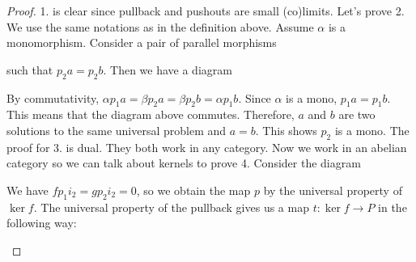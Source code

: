 \documentclass{article}
\theoremstyle{plain}
\theoremstyle{definition}
\theoremstyle{remark}
\begin{document}
\begin{proof}
    1. is clear since pullback and pushouts are small (co)limits. Let's prove 2. We use the same notations as in the definition above. Assume $\alpha$ is a monomorphism. Consider a pair of parallel morphisms 
    such that $p_2 a = p_2 b$. Then we have a diagram
    \begin{center}
    \end{center}
    By commutativity, $\alpha p_1 a = \beta p_2 a = \beta p_2 b = \alpha p_1 b$. Since $\alpha$ is a mono, $p_1 a = p_1 b$. This means that the diagram above commutes. Therefore, $a$ and $b$ are two solutions to the same universal problem and $a=b$. This shows $p_2$ is a mono. The proof for 3. is dual. They both work in any category. Now we work in an abelian category so we can talk about kernels to prove 4. Consider the diagram
    \begin{center}
    \end{center}
    We have $f p_1 i_2 = g p_2 i_2 = 0$, so we obtain the map $p$ by the universal property of $\ker f$. The universal property of the pullback gives us a map $t : \ker f \to P$ in the following way:
    \begin{center}
\end{center}
\end{proof}
\end{document}

